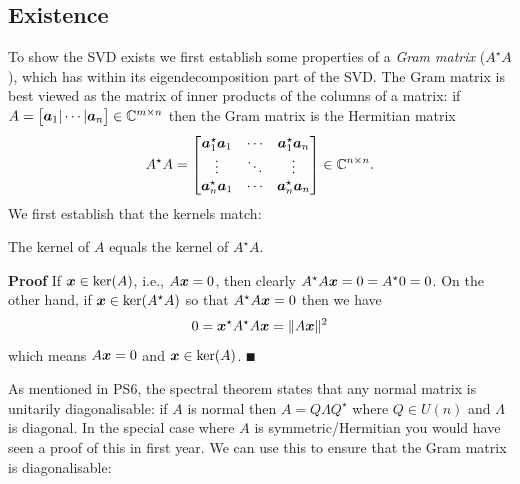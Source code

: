 \subsection{Existence}
To show the SVD exists we first establish some properties of a \emph{Gram matrix} ($A^\ensuremath{\star} A$), which has within its eigendecomposition part of the SVD. The Gram matrix is best viewed as the matrix of inner products of the columns of a matrix: if $A = \begin{bmatrix} \bm{{\mbox{\boldmath$a$\unboldmath}}}_1 | \cdots | \bm{{\mbox{\boldmath$a$\unboldmath}}}_n \end{bmatrix} \in {\mathbb C}^{m \times n}$ then the Gram matrix is the Hermitian matrix
\[
A^\ensuremath{\star} A = \begin{bmatrix} \ensuremath{\bm{\a}}_1^\ensuremath{\star} \ensuremath{\bm{\a}}_1 & \ensuremath{\cdots} &\ensuremath{\bm{\a}}_1^\ensuremath{\star} \ensuremath{\bm{\a}}_n \\
                        \ensuremath{\vdots} &  \ensuremath{\ddots} & \ensuremath{\vdots} \\
                        \ensuremath{\bm{\a}}_n^\ensuremath{\star} \ensuremath{\bm{\a}}_1 & \ensuremath{\cdots} &\ensuremath{\bm{\a}}_n^\ensuremath{\star} \ensuremath{\bm{\a}}_n \end{bmatrix} \ensuremath{\in} \ensuremath{\bbC}^{n \ensuremath{\times} n}.
\]
We first establish that the kernels match:

\begin{proposition} The kernel of $A$ equals the kernel of $A^\ensuremath{\star} A$. 

\end{proposition}
\textbf{Proof} If $\bm{{\mbox{\boldmath$x$\unboldmath}}} \in \hbox{ker}(A)$, i.e., $A \bm{{\mbox{\boldmath$x$\unboldmath}}} = 0$, then clearly $A^\star A \bm{{\mbox{\boldmath$x$\unboldmath}}} = 0 = A^\star 0 = 0$. On the other hand, if $\bm{{\mbox{\boldmath$x$\unboldmath}}} \in \hbox{ker}(A^\star A)$ so  that $A^\star A \bm{{\mbox{\boldmath$x$\unboldmath}}} = 0$ then we have
\[
0 = \bm{{\mbox{\boldmath$x$\unboldmath}}}^\star A^\star A \bm{{\mbox{\boldmath$x$\unboldmath}}} = \| A \bm{{\mbox{\boldmath$x$\unboldmath}}} \|^2
\]
which means $A \bm{{\mbox{\boldmath$x$\unboldmath}}} = 0$ and $\bm{{\mbox{\boldmath$x$\unboldmath}}} \in \hbox{ker}(A)$. \ensuremath{\QED}

As mentioned in PS6, the spectral theorem states that any normal matrix is unitarily diagonalisable: if $A$ is normal then $A = Q \ensuremath{\Lambda} Q^\ensuremath{\star}$ where $Q \ensuremath{\in} U(n)$ and $\ensuremath{\Lambda}$ is diagonal. In the special case where $A$ is symmetric/Hermitian you would have seen a proof of this in first year. We can use this to ensure that the Gram matrix is diagonalisable:

